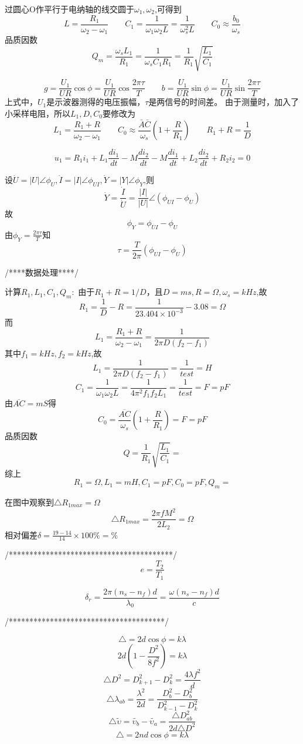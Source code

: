 \documentclass[UTF8]{article}
\begin{document}
{	过圆心O作平行于电纳轴的线交圆于$\omega_1, \omega_2$,可得到
	$$L = \frac{R_1}{\omega_2 - \omega_1}\qquad C_1 = \frac{1}{\omega_1\omega_2L} = \frac{1}{\omega_s^2L}\qquad C_0\approx\frac{b_0}{\omega_s}$$
	品质因数$$Q_m = \frac{\omega_s L_1}{R_1} = \frac{1}{\omega_s C_1 R_1} = \frac{1}{R_1}\sqrt{\frac{L_1}{C_1}}$$
	
	$$g = \frac{U_1}{UR}\cos\phi = \frac{U_1}{UR}\cos\frac{2\pi\tau}{T}\qquad b = \frac{U_1}{UR}\sin\phi = \frac{U_1}{UR}\sin\frac{2\pi\tau}{T}$$
	上式中，$U_1$是示波器测得的电压振幅，$\tau$是两信号的时间差。
	由于测量时，加入了小采样电阻，所以$L_1,D,C_0$要修改为
	$$L_1 = \frac{R_1+R}{\omega_2-\omega_1}\qquad C_0\approx\frac{\bar{A}\bar{C}}{\omega_s}(1+\frac{R}{R_1})\qquad R_1+R =\frac{1}{D}$$
	
	$$u_1 = R_1i_1 + L_1\frac{di_1}{dt} - M\frac{di_2}{dt} - M\frac{di_1}{dt} + L_2\frac{di_2}{dt} + R_2i_2 = 0$$
	
	设$\dot{U} = |U|\angle\phi_U, \dot{I} = |I|\angle\phi_{UI}, \dot{Y} = |Y|\angle\phi_Y$,则
	$$\dot{Y} = \frac{\dot{I}}{\dot{U}} = \frac{|I|}{|U|}\angle(\phi_{UI} - \phi_U)$$
	故
	$$\phi_Y = \phi_{UI} - \phi_U$$
	由$\phi_Y = \frac{2\pi\tau}{T}$知
	$$\tau = \frac{T}{2\pi}(\phi_{UI} - \phi_U)$$
	
	/****数据处理****/
	
	计算$R_1, L_1, C_1, Q_m:$
	由于$R_1+R = 1/D$，且$D= ms, R= \Omega, \omega_s = kHz$,故
	$$R_1 = \frac{1}{D} - R = \frac{1}{23.404\times10^{-3}} -3.08 = \Omega $$
	而
	$$L_1 = \frac{R_1+R}{\omega_2-\omega_1} = \frac{1}{2\pi D(f_2-f_1)}$$
	其中$f_1 = kHz, f_2 =  kHz$,故
	$$L_1 = \frac{1}{2\pi D(f_2-f_1)} = \frac{1}{test} = H$$
	$$C_1 = \frac{1}{\omega_1\omega_2L} = \frac{1}{4\pi^2f_1f_2L_1} = \frac{1}{test} = F = pF$$
	由$\overline{AC} = mS$得
	$$C_0 = \frac{\overline{AC}}{\omega_s}(1+\frac{R}{R_1}) = F = pF$$
	品质因数
	$$Q = \frac{1}{R_1}\sqrt{\frac{L_1}{C_1}} = $$
	综上
	$$R_1 = \Omega,L_1 = mH, C_1 = pF, C_0 = pF, Q_m = $$
	
	
	在图中观察到$\triangle R_{1max} = \Omega$
	$$\triangle R_{1max} = \frac{2\pi fM^2}{2L_2} = \Omega$$
	相对偏差$\delta = \frac{19-14}{14}\times100\% = \%$
	
	
	/****************************************/
	$$e = \frac{T_2}{T_1}$$
	
	$$\delta_r = \frac{2\pi (n_s - n_f)d}{\lambda_0} = \frac{\omega(n_s-n_f)d}{c}$$
	
	
	/**************************************/
	
	$$\triangle = 2d\cos\phi = k\lambda$$
	$$2d(1-\frac{D^2}{8f^2}) = k\lambda$$
	$$\triangle D^2 = D_{k+1}^2 - D_k^2 = \frac{4\lambda f^2}{d}$$
	$$\triangle \lambda_{ab} = \frac{\lambda^2}{2d} = \frac{D_b^2 - D_b^2}{D_{k-1}^2 - D_k^2}$$
	$$\triangle \tilde{\upsilon} = \widetilde{\upsilon_b} - \widetilde{\upsilon_a} = \frac{\triangle D_{ab}^2}{2d\triangle D^2}$$
	$$\triangle = 2nd\cos\phi = k\lambda$$
	
}
\end{document}
